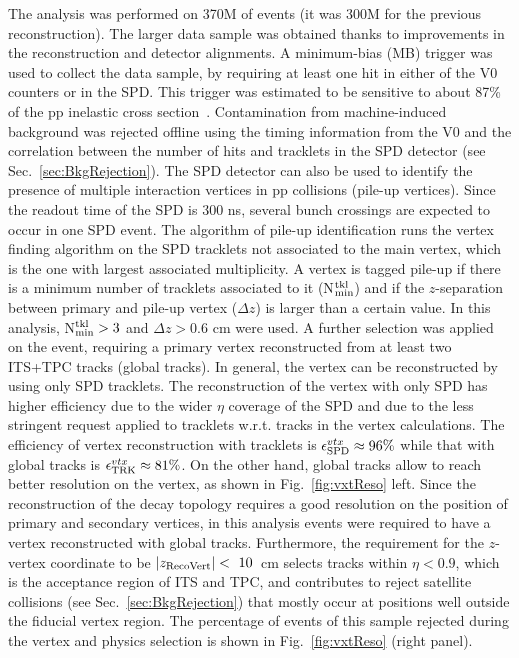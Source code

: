 The analysis was performed on 370M of events (it was 300M for the previous
reconstruction). The larger data sample was obtained thanks to improvements in the reconstruction
and detector alignments.
 A minimum-bias (MB)
trigger was used to collect the data sample, by requiring
at least one hit in either of the V0 counters or in the SPD.
This trigger was estimated to be sensitive to about 87\% of the pp inelastic
cross section~\cite{Gagliardi:2011he}. 
 Contamination from machine-induced background was rejected 
 offline using the timing information from the V0 and the correlation 
 between the number of hits and tracklets in the SPD
detector (see Sec.~\ref{sec:BkgRejection}).
 The SPD detector can also be used to identify the presence of multiple interaction
vertices in pp collisions (pile-up vertices). Since the readout time of the SPD is
300 ns, several bunch crossings are expected to occur in one SPD event.
The algorithm of pile-up identification runs the vertex finding algorithm 
on the SPD tracklets not associated to the
main vertex, which is the one with largest associated multiplicity. 
A vertex is tagged pile-up if there is a minimum number of 
tracklets associated to it (N$^{\rm tkl}_{\rm min}$) and if the 
$z$-separation between primary and pile-up vertex ($\Delta z$) is larger than a certain value.
In this analysis, N$^{\rm tkl}_{\rm min}>3$ and $\Delta z>0.6$ cm were used.
A further selection was applied on the event, requiring a primary vertex 
reconstructed from at least two ITS+TPC tracks (global tracks). In general, the vertex can be reconstructed by
using only SPD tracklets. The reconstruction of the vertex 
with only SPD has higher efficiency due to the wider $\eta$
coverage of the SPD and due to the less stringent request applied to tracklets w.r.t. tracks in
the vertex calculations. The efficiency of vertex reconstruction with 
tracklets is $\epsilon^{vtx}_{\rm SPD} \approx 96\%$ while that with global tracks
is $\epsilon^{vtx}_{\rm TRK} \approx 81\%$. On the other hand, global tracks
allow to reach better resolution on the vertex, as shown in Fig.~\ref{fig:vxtReso} left.
Since the reconstruction of the decay topology 
requires a good resolution on the position of primary and secondary vertices,
in this analysis events were required to have a vertex reconstructed with global tracks.
Furthermore, the requirement for the $z$-vertex coordinate to be $|z_{\rm RecoVert}|<~10$~cm 
selects tracks within $\eta < 0.9$, which is the acceptance region of ITS and TPC,
and contributes to reject satellite collisions (see Sec.~\ref{sec:BkgRejection}) 
that mostly occur at positions well outside the fiducial vertex region. 
The percentage of events of this sample rejected during the vertex and physics selection
is shown in Fig.~\ref{fig:vxtReso} (right panel). 

